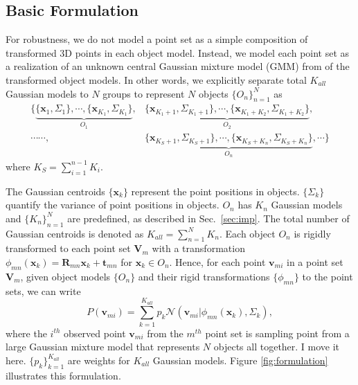 \subsection{Basic Formulation}
For robustness, we do not model a point set as a simple composition of transformed 3D points in each object model. 
Instead, we model each point set as a realization of an unknown central Gaussian mixture model (GMM) from of the transformed object models. 
In other words, we explicitly separate total $K_{all}$ Gaussian models to $N$ groups to represent $N$ objects $\{O_n\}_{n=1}^N$ as
%
\begin{equation}
\begin{aligned}
\{
\underbrace{ \{\mathbf{x}_{1},\Sigma_{1}\}, \cdots, \{\mathbf{x}_{K_1},\Sigma_{K_1}\}  }_{O_1},&\underbrace{ \{\mathbf{x}_{K_1+1},\Sigma_{K_1+1}\}, \cdots, \{\mathbf{x}_{K_1+K_2},\Sigma_{K_1+K_2}\}  }_{O_2},\\ 
\cdots \cdots,& 
\underbrace{ \{\mathbf{x}_{K_S+1},\Sigma_{K_S+1}\},\cdots,\{\mathbf{x}_{K_S+K_n},\Sigma_{K_S+K_n}\}  }_{O_n},\cdots \}
\end{aligned}
\end{equation}
where $K_S = \sum_{i=1}^{n-1}K_i$.

The Gaussian centroids $\{\mathbf{x}_{k}\}$ represent the point positions in objects. $\{\Sigma_{k}\}$ quantify the variance of point positions in objects. $O_n$ has $K_n$ Gaussian models and $\{K_n\}_{n=1}^N$ are predefined, as described in Sec.~\ref{sec:imp}.
The total number of Gaussian centroids is denoted as $K_{all} = \sum_{n=1}^{N}K_n$.  
%
Each object $O_{n}$ is rigidly transformed to each point set $\mathbf{V}_m$ with a transformation $\phi_{mn}(\mathbf{x}_{k})=\mathbf{R}_{mn}\mathbf{x}_{k}+\mathbf{t}_{mn}$ for $\mathbf{x}_{k} \in O_n$.
%
Hence, for each point $\mathbf{v}_{mi}$ in a point set $\mathbf{V}_m$, given object models $\{O_{n}\}$ and their rigid transformations $\{\phi_{mn}\}$ to the point sets, we can write
\begin{equation}
\label{equ:model}
P(\mathbf{v}_{mi})=\sum^{K_{all}}_{k=1}p_k\mathcal{N}(\mathbf{v}_{mi}|\phi_{mn}(\mathbf{x}_k),\Sigma_k),
\end{equation}
%
where the $i^{th}$ observed point $\mathbf{v}_{mi}$ from the $m^{th}$ point set is sampling point from a large Gaussian mixture model that represents $N$ objects all together.
I move it here.
$\{p_k\}_{k=1}^{K_{all}} $ are weights for $K_{all}$ Gaussian models. 
Figure \ref{fig:formulation} illustrates this formulation.


